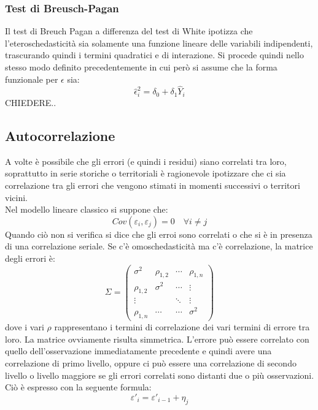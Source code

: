 \subsubsection{Test di Breusch-Pagan}
Il test di Breuch Pagan a differenza del test di White ipotizza che l'eteroschedasticità sia solamente una funzione lineare delle variabili indipendenti, trascurando quindi i termini quadratici e di interazione. Si procede quindi nello stesso modo definito precedentemente in cui però si assume che la forma funzionale per $\epsilon$ sia:
\begin{equation}
\hat{\epsilon}_i^2 = \delta_0 + \delta_1\hat{Y}_i
\end{equation}
CHIEDERE..
\subsection{Autocorrelazione}
A volte è possibile che gli errori (e quindi i residui) siano correlati tra loro, soprattutto in serie storiche o territoriali è ragionevole ipotizzare che ci sia correlazione tra gli errori che vengono stimati in momenti successivi o territori vicini.\\
Nel modello lineare classico si suppone che:
\begin{equation}
Cov(\varepsilon_i, \varepsilon_j) = 0 \quad \forall i \neq j
\end{equation}
Quando ciò non si verifica si dice che gli erroi sono correlati o che si è in presenza di una correlazione seriale. Se c'è omoschedasticità ma c'è correlazione, la matrice degli errori è:
\begin{equation}
\Sigma = \begin{pmatrix}
\sigma^2 & \rho_{1,2} & \cdots & \rho_{1,n} \\ 
\rho_{1,2} & \sigma^2 & \cdots & \vdots \\ 
\vdots &  & \ddots & \vdots \\ 
\rho_{1,n} & \cdots & \cdots & \sigma^2
\end{pmatrix} 
\end{equation}
dove i vari $\rho$ rappresentano i termini di correlazione dei vari termini di errore tra loro. La matrice ovviamente risulta simmetrica.
L'errore può essere correlato con quello dell'osservazione immediatamente precedente e quindi avere una correlazione di primo livello, oppure ci può essere una correlazione di secondo livello o livello maggiore se gli errori correlati sono distanti due o più osservazioni. Ciò è espresso con la seguente formula:
\begin{equation}
\varepsilon'_i = \varepsilon'_{i-1} + \eta_j
\end{equation}
